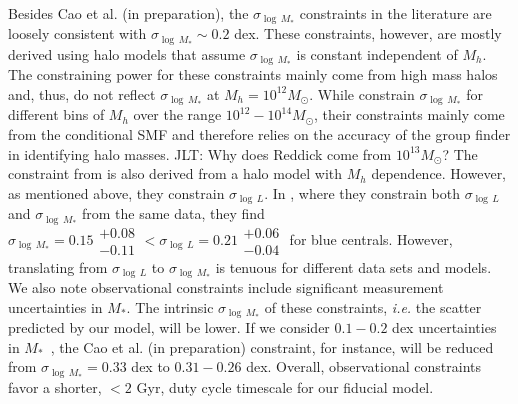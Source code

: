 \documentclass[12pt, letterpaper, preprint, tighten]{aastex62}
\newcommand{\ch}[1]{{\color{orange}{\bf CH:} #1}}
\newcommand{\edt}[1]{{\color{dred}{\bf} #1}}
\begin{document}
\edt{Besides Cao et al. (in preparation), the $\sigma_{\log\,M_*}$ constraints
in the literature are loosely consistent with $\sigma_{\log\,M_*} \sim 0.2$ dex.
These constraints, however, are mostly derived using halo models that assume
$\sigma_{\log\,M_*}$ is constant independent of $M_h$. The constraining power for
these constraints mainly come from high mass halos and, thus, do not reflect
$\sigma_{\log\,M_*}$ at $M_h=10^{12}M_\odot$}.
While \cite{reddick2013} constrain $\sigma_{\log\,M_*}$ for different bins of
$M_h$ over the range $10^{12} - 10^{14} M_\odot$, %
their constraints mainly come from the conditional SMF and therefore relies on
the accuracy of the \cite{tinker2011} group finder in identifying halo masses.
\ch{JLT: Why does Reddick come from $10^{13} M_\odot$?} %
The constraint from \cite{lange2018a} is also derived from a halo model
with $M_h$ dependence. However, as mentioned above, they constrain $\sigma_{\log\,L}$.
In \cite{more2011}, where they constrain both $\sigma_{\log\,L}$ and $\sigma_{\log\,M_*}$
from the same data, they find
$\sigma_{\log\,M_*} = 0.15\substack{+0.08\\ -0.11} < \sigma_{\log\,L} = 0.21\substack{+0.06\\ -0.04}$
for blue centrals. However, translating from $\sigma_{\log\,L}$ to
$\sigma_{\log\,M_*}$ is tenuous for different data sets and models. %
\edt{We also note observational constraints include significant measurement
uncertainties in $M_*$. The intrinsic $\sigma_{\log\,M_*}$ of these constraints,
\emph{i.e.} the scatter predicted by our model, will be lower. If we consider
$0.1 - 0.2$ dex uncertainties in $M_*$~\citep{roediger2015}, the
Cao et al. (in preparation) constraint, for instance, will be reduced from
$\sigma_{\log\,M_*} = 0.33$ dex to $0.31 - 0.26$ dex. Overall, observational
constraints favor a shorter, $< 2$ Gyr, duty cycle timescale for our fiducial
model.}
\end{document}
